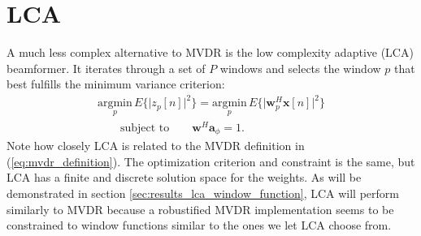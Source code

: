 \documentclass[10pt,journal,draftclsnofoot,onecolumn]{IEEEtran}
\let\MYoriglatexcaption\caption               %
\renewcommand{\caption}[2][\relax]{\MYoriglatexcaption[#2]{#2}}
\newcommand\Fig[1]{Fig.~\ref{#1}}
\newcommand\eq[1]{(\ref{#1})}
\newcommand\nn{\nonumber\\}
\newcommand\argmin[1]{\text{arg}\;\underset{#1}{\text{min}}}
\renewcommand\H{^{\scriptscriptstyle H}}
\renewcommand\vec[1]{\boldsymbol{#1}}
\newcommand\1{\vec 1}
\renewcommand*\a{\vec a}
\newcommand*\w{\vec w}
\newcommand*\x{\vec x}
\renewcommand\argmin{\text{argmin}}
\begin{document}
% 


% 


\section{LCA}\label{sec:lca}

A much less complex alternative to MVDR is the low complexity adaptive (LCA) beamformer. It iterates through a set of $P$ windows and selects the window $p$ that best fulfills the minimum variance criterion:
%
\begin{align}
\underset{p}{\argmin}\, E\{\big|z_p[n]\big|^2\} = \underset{p}{\argmin}\, E\big\{\big|\w_{p}\H\x[n]\big|^2\big\}\nn
\qquad\text{subject to}\qquad \w\H\a_\phi = 1.\label{eq:lca_definition}
\end{align}\label{lca_criterion}
%
Note how closely LCA is related to the MVDR definition in \eq{eq:mvdr_definition}. The optimization criterion and constraint is the same, but LCA has a finite and discrete solution space for the weights. As will be demonstrated in section \ref{sec:results_lca_window_function}, LCA will perform similarly to MVDR because a robustified MVDR implementation seems to be constrained to window functions similar to the ones we let LCA choose from.
\end{document}
